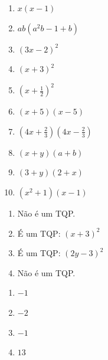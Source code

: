 \begin{respostas}{4}
    \ansitem{} \begin{multicols}{3}
        \begin{enumerate}[label=\alph*)]
            \item $x(x-1)$
            
            \item $ab(a^2b-1+b)$
            
            \item $(3x-2)^2$
            
            \item $(x+3)^2$
            
            \item $(x+\frac{1}{2})^2$
            
            \item $(x+5)(x-5)$
            
            \item $(4x+\frac{2}{3})(4x-\frac{2}{3})$
            
            \item $(x+y)(a+b)$
            
            \item $(3+y)(2+x)$
            
            \item $(x^2+1)(x-1)$
        \end{enumerate}
    \end{multicols}
    
    \ansitem{} \begin{multicols}{2}
        \begin{enumerate}[label=\alph*)]
            \item Não é um TQP.
            
            \item É um TQP: $(x+3)^2$
            
            \item É um TQP: $(2y-3)^2$
            
            \item Não é um TQP.
        \end{enumerate}
    \end{multicols}

    \ansitem{} \begin{multicols}{4}
        \begin{enumerate}[label=\alph*)]
            \item $-1$
            
            \item $-2$
            
            \item $-1$
            
            \item $13$
        \end{enumerate}
    \end{multicols}
    
\end{respostas}
